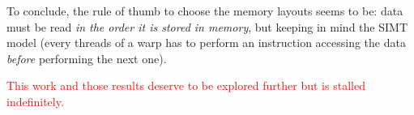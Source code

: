\documentclass{article}
\begin{document}
To conclude, the rule of thumb to choose the memory layouts seems to be: data must be read \textit{in the order it is stored in memory}, but keeping in mind the SIMT model (every threads of a warp has to perform an instruction accessing the data \textit{before} performing the next one).

\textcolor{red}{This work and those results deserve to be explored further but is stalled indefinitely.}

\newpage
\nocite{*}


\end{document}
